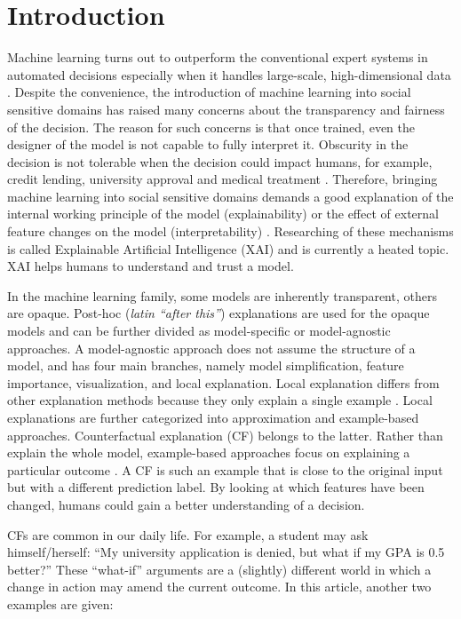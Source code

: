 \section{Introduction}
Machine learning turns out to outperform the conventional expert systems in automated decisions especially when it handles large-scale, high-dimensional data \cite{XAIBook}. Despite the convenience, the introduction of machine learning into social sensitive domains has raised many concerns about the transparency and fairness of the decision. The reason for such concerns is that once trained, even the designer of the model is not capable to fully interpret it. Obscurity in the decision is not tolerable when the decision could impact humans, for example, credit lending, university approval and medical treatment \cite{CFReview}. Therefore, bringing machine learning into social sensitive domains demands a good explanation of the internal working principle of the model (explainability) or the effect of external feature changes on the model (interpretability) \cite{XAIBook}.
Researching of these mechanisms is called Explainable Artificial Intelligence (XAI) and is currently a heated topic. XAI helps humans to understand and trust a model.

In the machine learning family, some models are inherently transparent, others are opaque. Post-hoc (\emph{latin ``after this''}) explanations are used for the opaque models and can be further divided as model-specific or model-agnostic approaches. A model-agnostic approach does not assume the structure of a model, and has four main branches, namely model simplification, feature importance, visualization, and local explanation. Local explanation differs from other explanation methods because they only explain a single example \cite{CFReview}. Local explanations are further categorized into approximation and example-based approaches. Counterfactual explanation (CF) belongs to the latter. Rather than explain the whole model, example-based approaches focus on explaining a particular outcome \cite{CFReview}. A CF is such an example that is close to the original input but with a different prediction label. By looking at which features have been changed, humans could gain a better understanding of a decision.

CFs are common in our daily life. For example, a student may ask himself/herself: ``My university application is denied, but what if my GPA is 0.5 better?'' These ``what-if'' arguments are a (slightly) different world in which a change in action may amend the current outcome. In this article, another two examples are given:


